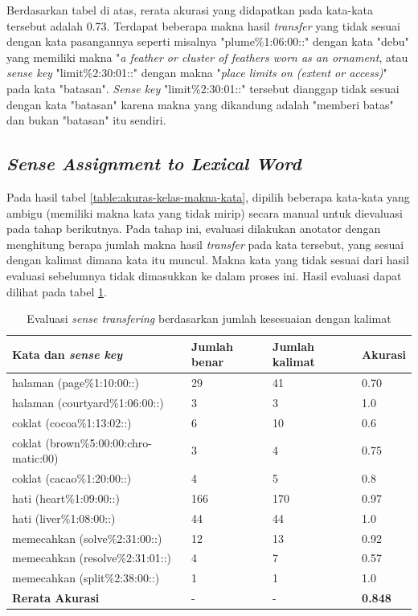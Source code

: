 Berdasarkan tabel di atas, rerata akurasi yang didapatkan pada kata-kata tersebut adalah 0.73. Terdapat beberapa makna hasil \textit{transfer} yang tidak sesuai dengan kata pasangannya seperti misalnya "plume\%1:06:00::" dengan kata "debu" yang memiliki makna "\textit{a feather or cluster of feathers worn as an ornament}, atau \textit{sense key} "limit\%2:30:01::" dengan makna "\textit{place limits on (extent or access)}" pada kata "batasan". \textit{Sense key} "limit\%2:30:01::" tersebut dianggap tidak sesuai dengan kata "batasan" karena makna yang dikandung adalah "memberi batas" dan bukan "batasan" itu sendiri.

\subsection{\textit{Sense Assignment to Lexical Word}}

Pada hasil tabel \ref{table:akuras-kelas-makna-kata}, dipilih beberapa kata-kata yang ambigu (memiliki makna kata yang tidak mirip) secara manual untuk dievaluasi pada tahap berikutnya. Pada tahap ini, evaluasi dilakukan anotator dengan menghitung berapa jumlah makna hasil \textit{transfer} pada kata tersebut, yang sesuai dengan kalimat dimana kata itu muncul. Makna kata yang tidak sesuai dari hasil evaluasi sebelumnya tidak dimasukkan ke dalam proses ini. Hasil evaluasi dapat dilihat pada tabel \ref{table:evaluasi-sense-transfer-2}.

\begin{table}
	\centering
	\caption{Evaluasi \textit{sense transfering} berdasarkan jumlah kesesuaian dengan kalimat}
	\label{table:evaluasi-sense-transfer-2}
	\begin{tabular}{|p{4cm}|p{2.85cm}|p{2.85cm}|p{1.4cm}|}
		\hline
		\textbf{Kata dan \textit{sense key}} & \textbf{Jumlah benar} & \textbf{Jumlah kalimat} & \textbf{Akurasi}
		\\ \hline
		halaman (page\%1:10:00::) & 29 & 41 & 0.70 \\ \hline
		halaman (courtyard\%1:06:00::) & 3 & 3 & 1.0 \\ \hline
		coklat (cocoa\%1:13:02::) & 6 & 10 & 0.6 \\ \hline
		coklat (brown\%5:00:00:chro-matic:00) & 3 & 4 & 0.75 \\ \hline
		coklat (cacao\%1:20:00::) & 4 & 5 & 0.8 \\ \hline
		hati (heart\%1:09:00::) & 166 & 170 & 0.97 \\ \hline
		hati (liver\%1:08:00::) & 44 & 44 & 1.0 \\ \hline
		memecahkan (solve\%2:31:00::) & 12 & 13 & 0.92 \\ \hline
		memecahkan (resolve\%2:31:01::) & 4 & 7 & 0.57 \\ \hline
		memecahkan (split\%2:38:00::) & 1 & 1 & 1.0 \\ \hline
		\hline
		\textbf{Rerata Akurasi} & - & - & \textbf{0.848} \\ \hline
	\end{tabular}
\end{table}

